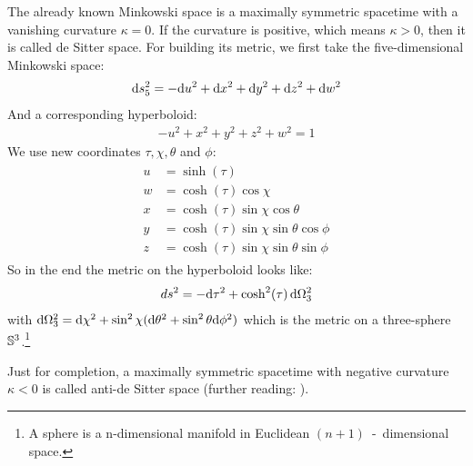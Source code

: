 	The already known Minkowski space is a maximally symmetric spacetime with a vanishing curvature $\kappa = 0$. If the curvature is positive, which means $\kappa > 0$, then it is called de Sitter space. For building its metric, we first take the five-dimensional Minkowski space:
		\begin{align}
			\mathrm{d} s^2_5 = -\mathrm{d} u^2 + \mathrm{d} x^2 + \mathrm{d} y^2 + \mathrm{d} z^2 + \mathrm{d} w^2
		\end{align}
	And a corresponding hyperboloid:
		\begin{align}
			-u^2 + x^2 + y^2 + z^2 + w^2 = 1
		\end{align}
	We use new coordinates $\tau, \chi, \theta$ and $\phi$:
		\begin{align}
			\begin{split}
			u &= \sinh (\tau) \\
			w &= \cosh (\tau) \cos \chi \\
			x &= \cosh (\tau) \sin \chi \cos \theta \\
			y &= \cosh (\tau) \sin \chi \sin \theta \cos \phi \\
			z &= \cosh (\tau) \sin \chi \sin \theta \sin \phi
			\end{split}
		\end{align}
	So in the end the metric on the hyperboloid looks like:
		\begin{align} \label{de-sitter}
			ds^2 = -\mathrm{d} \tau^2 + \cosh^2(\tau) \, \mathrm{d} \Omega^2_3 
		\end{align}
	with $\mathrm{d} \Omega_3^2 = \mathrm{d} \chi^2 + \sin^2 \chi (\mathrm{d} \theta^2 + \sin^2 \theta \mathrm{d} \phi^2)$
	which is the metric on a three-sphere $\mathbb{S}^3$.\footnote{A sphere is a n-dimensional manifold in Euclidean $(n+1)$~-~dimensional space.}
	
	Just for completion, a maximally symmetric spacetime with negative curvature $\kappa < 0$ is called anti-de Sitter space (further reading: \cite{SpacetimeCarroll}).